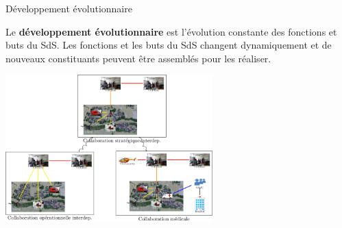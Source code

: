 \begin{frame}{Développement évolutionnaire}
\begin{definition}{}
Le \textbf{développement évolutionnaire} est l'évolution constante des
fonctions et buts du SdS. Les fonctions et les buts du SdS changent
dynamiquement et de nouveaux constituants peuvent être assemblés pour
les réaliser.
\end{definition}
\centering
\includegraphics[width=8cm]{imgs/dev_evolutionnaire.pdf}
\end{frame}
%


